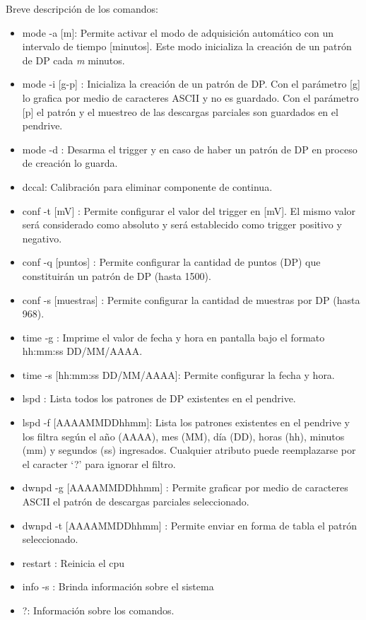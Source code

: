 \vspace{5mm}

Breve descripción de los comandos:
\begin{itemize}
\item mode -a [m]: Permite activar el modo de adquisición automático con un intervalo de tiempo [minutos]. Este modo inicializa la creación de un patrón de DP cada \textit{m} minutos.
\item mode -i [g-p] : Inicializa la creación de un patrón de DP. Con el parámetro [g] lo grafica por medio de caracteres ASCII y no es guardado. Con el parámetro [p] el patrón y el muestreo de las descargas parciales son guardados en el pendrive.
\item mode -d : Desarma el trigger y en caso de haber un patrón de DP en proceso de creación lo guarda.
\item dccal: Calibración para eliminar componente de continua.
\item conf -t [mV] : Permite configurar el valor del trigger en [mV]. El mismo valor será considerado como absoluto y será establecido como trigger positivo y negativo.
\item conf -q [puntos] : Permite configurar la cantidad de puntos (DP) que constituirán un patrón de DP (hasta 1500). 
\item conf -s [muestras] : Permite configurar la cantidad de muestras por DP (hasta 968).
\item time -g : Imprime el valor de fecha y hora en pantalla bajo el formato hh:mm:ss DD/MM/AAAA.
\item time -s [hh:mm:ss DD/MM/AAAA]: Permite configurar la fecha y hora.
\item lspd : Lista todos los patrones de DP existentes en el pendrive.
\item lspd -f [AAAAMMDDhhmm]:  Lista los patrones existentes en el pendrive y los filtra según el año (AAAA), mes (MM), día (DD), horas (hh), minutos (mm) y segundos (ss) ingresados. Cualquier atributo puede reemplazarse por el caracter ‘?’ para ignorar el filtro.
\item dwnpd -g [AAAAMMDDhhmm] : Permite graficar por medio de caracteres ASCII el patrón de descargas parciales seleccionado.
\item dwnpd -t [AAAAMMDDhhmm] : Permite enviar en forma de tabla el patrón seleccionado.
\item restart : Reinicia el cpu
\item info -s : Brinda información sobre el sistema
\item ?: Información sobre los comandos.
\end{itemize}

